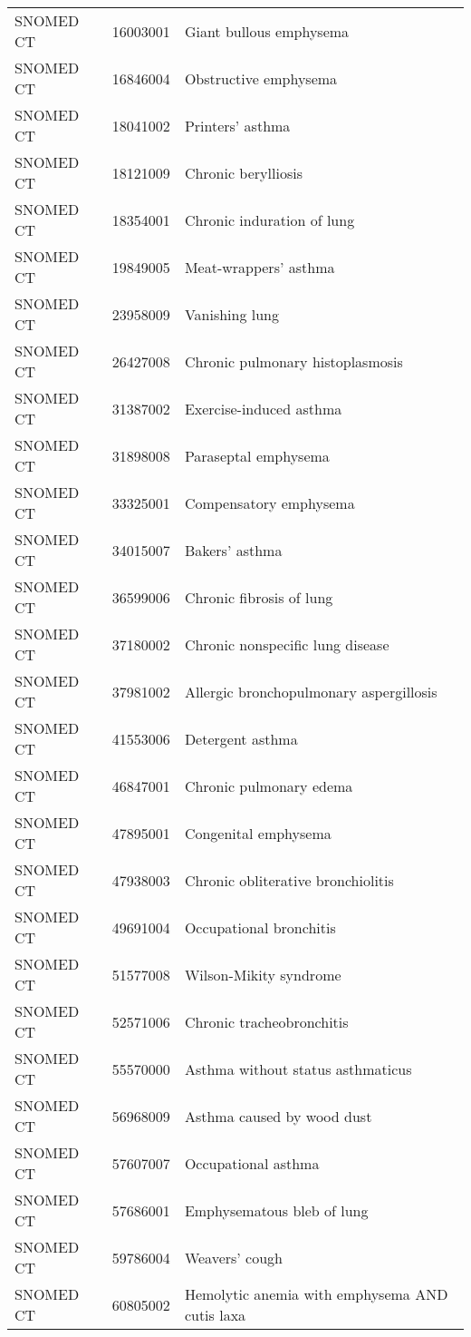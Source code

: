 \begin{table}[ht]
\begin{tabular}{lll}
  SNOMED CT & 16003001 & Giant bullous emphysema \\ 
  SNOMED CT & 16846004 & Obstructive emphysema \\ 
  SNOMED CT & 18041002 & Printers' asthma \\ 
  SNOMED CT & 18121009 & Chronic berylliosis \\ 
  SNOMED CT & 18354001 & Chronic induration of lung \\ 
  SNOMED CT & 19849005 & Meat-wrappers' asthma \\ 
  SNOMED CT & 23958009 & Vanishing lung \\ 
  SNOMED CT & 26427008 & Chronic pulmonary histoplasmosis \\ 
  SNOMED CT & 31387002 & Exercise-induced asthma \\ 
  SNOMED CT & 31898008 & Paraseptal emphysema \\ 
  SNOMED CT & 33325001 & Compensatory emphysema \\ 
  SNOMED CT & 34015007 & Bakers' asthma \\ 
  SNOMED CT & 36599006 & Chronic fibrosis of lung \\ 
  SNOMED CT & 37180002 & Chronic nonspecific lung disease \\ 
  SNOMED CT & 37981002 & Allergic bronchopulmonary aspergillosis \\ 
  SNOMED CT & 41553006 & Detergent asthma \\ 
  SNOMED CT & 46847001 & Chronic pulmonary edema \\ 
  SNOMED CT & 47895001 & Congenital emphysema \\ 
  SNOMED CT & 47938003 & Chronic obliterative bronchiolitis \\ 
  SNOMED CT & 49691004 & Occupational bronchitis \\ 
  SNOMED CT & 51577008 & Wilson-Mikity syndrome \\ 
  SNOMED CT & 52571006 & Chronic tracheobronchitis \\ 
  SNOMED CT & 55570000 & Asthma without status asthmaticus \\ 
  SNOMED CT & 56968009 & Asthma caused by wood dust \\ 
  SNOMED CT & 57607007 & Occupational asthma \\ 
  SNOMED CT & 57686001 & Emphysematous bleb of lung \\ 
  SNOMED CT & 59786004 & Weavers' cough \\ 
  SNOMED CT & 60805002 & Hemolytic anemia with emphysema AND cutis laxa \\ 

\end{tabular}
\end{table}
